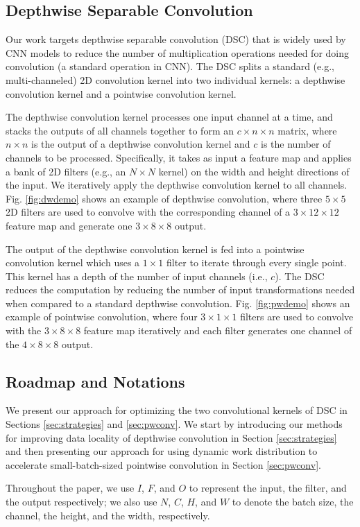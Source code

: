 \subsection{Depthwise Separable Convolution}
Our work targets depthwise separable convolution (DSC) that is widely used by  CNN  models to reduce the number of multiplication
operations needed for doing convolution (a standard operation in CNN). The DSC splits a standard (e.g., multi-channeled) 2D
convolution kernel into two individual kernels: a depthwise convolution kernel and a pointwise convolution kernel. 

The depthwise
convolution kernel processes one input channel at a time, and stacks the outputs of all channels together to form an $c \times n \times n$
matrix, where $n \times n$ is the output of a depthwise convolution kernel and $c$ is the number of channels to be processed. Specifically,
it takes as input a feature map and applies a bank of 2D filters (e.g., an $N \times N$ kernel) on the width and height directions of
the input. We iteratively apply the depthwise convolution kernel to all channels. Fig. \ref{fig:dwdemo} shows an example of depthwise convolution, where three $5 \times 5$ 2D filters are used to convolve with the corresponding channel of a $3 \times 12 \times 12$ feature map and generate one $3 \times 8 \times 8$ output. 

The output of the depthwise convolution kernel is fed
into a pointwise convolution kernel which uses a $1 \times 1$ filter to iterate through every single point. This kernel has a depth of the
number of input channels (i.e., $c$). The DSC reduces the computation by reducing the number of input transformations needed when compared
to a standard depthwise convolution. Fig. \ref{fig:pwdemo} shows an example of pointwise convolution, where four $3 \times 1 \times 1$ filters are used to convolve with the $3 \times 8 \times 8$ feature map iteratively and each filter generates one channel of the $4 \times 8 \times 8$ output.


\subsection{Roadmap and Notations\label{sec:roadmap}} We present our approach for optimizing the two convolutional kernels of DSC in
Sections \ref {sec:strategies} and \ref {sec:pwconv}. We start by introducing our methods for improving data locality of depthwise
convolution in Section \ref{sec:strategies} and then presenting our approach for using dynamic work distribution to accelerate
small-batch-sized pointwise convolution in Section \ref {sec:pwconv}.

 Throughout the paper, we use $I$, $F$, and $O$ to represent the input, the filter, and the output respectively; we also
use $N$, $C$, $H$, and $W$ to denote the batch size, the channel, the height, and the width, respectively.
